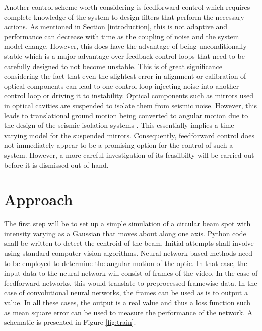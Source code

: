 \documentclass[colorlinks=true,pdfstartview=FitV,linkcolor=blue,
            citecolor=red,urlcolor=magenta]{ligodoc}
\newcommand{\G}[1]{\textcolor{JungleGreen}{#1}} %
\begin{document}

    Another control scheme worth considering is feedforward control which requires complete knowledge of the system to design filters that perform the necessary actions. As mentioned in Section \ref{introduction}, this is not adaptive and performance can decrease with time as the coupling of noise and the system model change. However, this does have the advantage of being unconditionally stable which is a major advantage over feedback control loops that need to be carefully designed to not become unstable. This is of great significance considering the fact that even the slightest error in alignment or calibration of optical components can lead to one control loop injecting noise into another control loop or driving it to instability. Optical components such as mirrors used in optical cavities are suspended to isolate them from seismic noise. However, this leads to translational ground motion being converted to angular motion due to the design of the seismic isolation systems \cite{feedforward}. This essentially implies a time varying model for the suspended mirrors. Consequently, feedforward control does not immediately appear to be a promising option for the control of such a system. However, a more careful investigation of its feasilbilty will be carried out before it is dismissed out of hand.




\section{Approach}\label{approach}
    
    The first step will be to set up a simple simulation of a circular beam spot with intensity varying as a Gaussian that moves about along one axis. Python code shall be written to detect the centroid of the beam. Initial attempts shall involve using standard computer vision algorithms. Neural network based methods need to be employed to determine the angular motion of the optic. In that case, the input data to the neural network will consist of frames of the video. In the case of feedforward networks, this would translate to preprocessed framewise data. In the case of convolutional neural networks, the frames can be used as is to output a value. In all these cases, the output is a real value and thus a loss function such as mean square error can be used to measure the performance of the network. A schematic is presented in Figure \ref{fig:train}.
\end{document}
